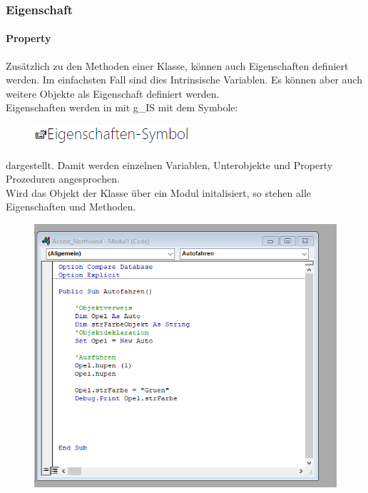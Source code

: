 \subsubsection{Eigenschaft}
\paragraph{Property} 
Zusätzlich zu den Methoden einer Klasse, können auch Eigenschaften definiert werden. Im einfachsten Fall sind dies Intrinsische Variablen. Es können aber auch weitere Objekte als Eigenschaft definiert werden.\\ 
Eigenschaften werden in mit \gls{g_IS} mit dem Symbole:
\begin{figure}[H]
	\centering
	\includegraphics[scale = 0.7]{attachment/chapter_2/Scc032}
	\caption{}
	\label{fig:Scc032}
\end{figure} 
dargestellt. Damit werden einzelnen Variablen, Unterobjekte und Property Prozeduren angesprochen. \\
Wird das Objekt  der Klasse  über ein Modul initalisiert, so stehen alle Eigenschaften und Methoden.  
\begin{figure}[H]
	\centering
	\includegraphics[scale = 0.3]{attachment/chapter_2/Scc037}
	\caption{}
	\label{fig:Scc037}
\end{figure}
